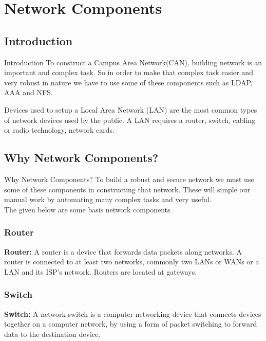 \documentclass[xcolor=dvipsnames]{beamer}
\begin{document}
\section{Network Components}
\subsection{Introduction}
\begin{frame}{Introduction}
To construct a Campus Area Network(CAN), building network is an important and complex task. So in order to make that complex task easier and very robust in nature we have to use some of these components such as LDAP, AAA and NFS.
\newline

Devices used to setup a Local Area Network (LAN) are the most common types of network devices used by the public. A LAN requires a router, switch, cabling or radio technology, network cards.
\end{frame}

\subsection{Why Network Components?}
\begin{frame}{Why Network Components?}
To build a robust and secure network we must use some of these components in constructing that network. These will simple our manual work by automating many complex tasks and very useful.\linebreak \\
The given below are some basis network components\linebreak \\ 

\subsubsection{Router}
\textbf{Router: }
A router is a device that forwards data packets along networks. A router is connected to at least two networks, commonly two LANs or WANs or a LAN and its ISP's network. Routers are located at gateways.\linebreak \\
\subsubsection{Switch}
\textbf{Switch: }
A network switch is a computer networking device that connects devices together on a computer network, by using a form of packet switching to forward data to the destination device.
\end{frame}
\end{document}
